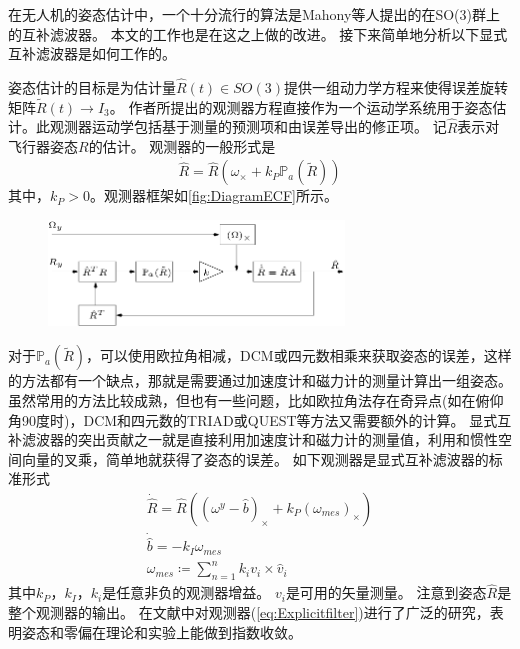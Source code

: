 \documentclass[
  type=master
]{gdutthesis}
\begin{document}
在无人机的姿态估计中，一个十分流行的算法是Mahony等人提出的在SO(3)群上的互补滤波器\cite{mahony2008nonlinear}。
本文的工作也是在这之上做的改进。
接下来简单地分析以下显式互补滤波器是如何工作的。

姿态估计的目标是为估计量$\hat{R}(t)\in SO(3)$提供一组动力学方程来使得误差旋转矩阵$\widetilde{R}(t)\rightarrow I_3$。
作者所提出的观测器方程直接作为一个运动学系统用于姿态估计。此观测器运动学包括基于测量的预测项和由误差导出的修正项。
记$\hat{R}$表示对飞行器姿态$R$的估计。
观测器的一般形式是
\begin{equation}\label{eq:passivefilter}
	\dot{\hat{R}}=\hat{R}(\omega_{\times}+k_P \mathbb{P}_a(\widetilde{R}))
\end{equation}
其中，$k_P>0$。观测器框架如\autoref{fig:DiagramECF}所示。
\begin{figure}[htbp]
	\centering
	\includegraphics[width=0.7\textwidth]{Block-diagram-of-the-simplified-form-of-the-passive-complementary-filter.png}
	\label{fig:DiagramECF}
\end{figure}
对于$\mathbb{P}_a(\widetilde{R})$，可以使用欧拉角相减，DCM或四元数相乘来获取姿态的误差，这样的方法都有一个缺点，那就是需要通过加速度计和磁力计的测量计算出一组姿态。
虽然常用的方法比较成熟，但也有一些问题，比如欧拉角法存在奇异点(如在俯仰角90度时)，DCM和四元数的TRIAD或QUEST等方法又需要额外的计算。
显式互补滤波器的突出贡献之一就是直接利用加速度计和磁力计的测量值，利用和惯性空间向量的叉乘，简单地就获得了姿态的误差。
如下观测器是\vspace{1ex}显式互补滤波器的标准形式
\begin{gather}\label{eq:Explicitfilter}
		\dot{\hat{R}} =\hat{R}((\omega^y - \hat{b})_{\times}+k_P (\omega_{mes})_{\times})\\
		\dot{\hat{b}} =-k_I \omega_{mes}\\
		\omega_{mes} \coloneqq \sum_{n=1}^{n} k_i v_i \times \hat{v}_i	
\end{gather}
其中$k_P$，$k_I$，$k_i$是任意非负的观测器增益。
$v_i$是可用的矢量测量。
注意到姿态$\hat{R}$是整个观测器的输出。
在文献\parencite{mahony2008nonlinear}中对观测器(\autoref{eq:Explicitfilter})进行了广泛的研究，表明姿态和零偏在理论和实验上能做到指数收敛。
\end{document}
